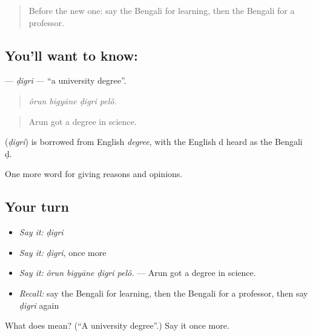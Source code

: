 \begin{quote}
Before the new one: say the Bengali for learning, then the Bengali for a professor.
\end{quote}

\subsection*{You'll want to know: }
\textbf{} — \emph{ḍigri} — \textquotedblleft{}a university degree\textquotedblright{}.

\begin{quote}
   
\end{quote}

\begin{quote}
\emph{ôrun bigyāne ḍigri pelô.}
\end{quote}

\begin{quote}
Arun got a degree in science.
\end{quote}

\begin{cousinweb}
\textbf{} (\emph{ḍigri}) is borrowed from English \emph{degree}, with the English d heard as the Bengali ḍ.
\end{cousinweb}

\begin{grammarlens}[title={What you've built}]
One more word for giving reasons and opinions.
\end{grammarlens}

\subsection*{Your turn}
\begin{itemize}
\raggedright
  \item \emph{Say it:} \emph{ḍigri}
  \item \emph{Say it:} \emph{ḍigri}, once more
  \item \emph{Say it:} \emph{ôrun bigyāne ḍigri pelô.} — Arun got a degree in science.
  \item \emph{Recall:} say the Bengali for learning, then the Bengali for a professor, then say \emph{ḍigri} again
\end{itemize}

\begin{tcolorbox}[breakable,colback=teal!4,colframe=teal!35!black,title={Before you move on}]
What does  mean? (\textquotedblleft{}A university degree\textquotedblright{}.) Say it once more.
\end{tcolorbox}
